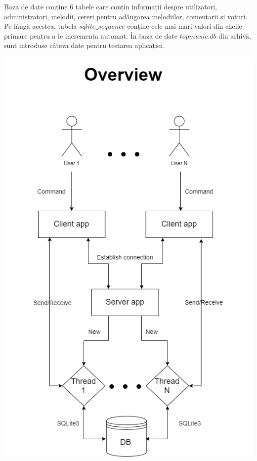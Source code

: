 \documentclass{article}
\begin{document}
Baza de date conține 6 tabele care conțin informații despre utilizatori, administratori, melodii, cereri pentru adăugarea melodiilor, comentarii și voturi. Pe lângă acestea, tabela $sqlite\_sequence$ conține cele mai mari valori din cheile primare pentru a le incrementa automat. În baza de date $topmusic.db$ din arhivă, sunt introduse câteva date pentru testarea aplicației. 

\pagebreak
\includegraphics[width=\textwidth]{overview}
\end{document}
